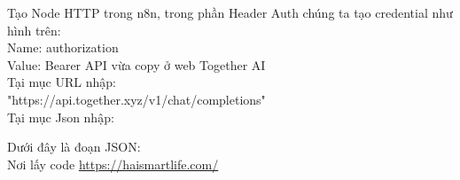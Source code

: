 \begin{itemize}[label=]
\begin{figure}[H]
    \end{figure}

    
 Tạo Node HTTP trong n8n, trong phần Header Auth chúng ta tạo credential như hình trên:\\
 Name: authorization\\
 Value: Bearer API vừa copy ở web Together AI\\
 

Tại mục URL nhập: \\
"https://api.together.xyz/v1/chat/completions"\\

Tại mục Json nhập: 


Dưới đây là đoạn JSON:\\

Nơi lấy code \url{https://haismartlife.com/}


\end{itemize}
